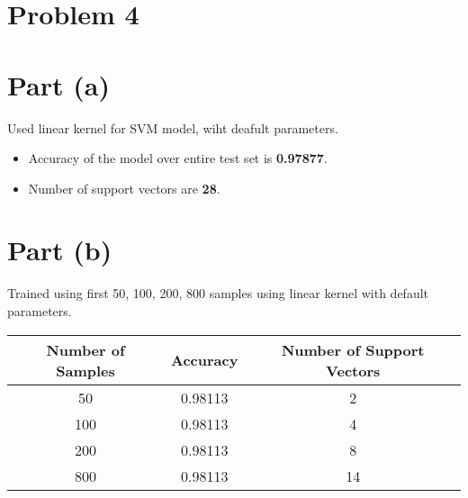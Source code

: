 \documentclass[12pt]{article}
\begin{document}
\section*{Problem 4}
\section*{Part (a)}
Used linear kernel for SVM model, wiht deafult parameters.
\begin{itemize}
    \item Accuracy of the model over entire test set is \textbf{0.97877}.
    \item Number of support vectors are \textbf{28}.
\end{itemize}

\section*{Part (b)}
Trained using first {50, 100, 200, 800} samples using linear kernel with default parameters.
\begin{center}
    \begin{tabular}{|c|c|c|}
        \hline
        \textbf{Number of Samples} & \textbf{Accuracy} & \textbf{Number of Support Vectors} \\
        \hline
        50 & 0.98113 & 2 \\
        100 & 0.98113 & 4 \\
        200 & 0.98113 & 8 \\
        800 & 0.98113 & 14 \\
        \hline
    \end{tabular}
\end{center}
\end{document}
